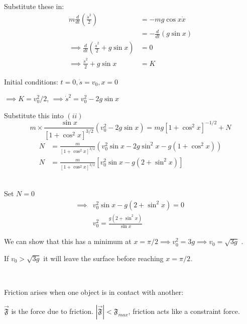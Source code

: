 \documentclass[10pt]{scrartcl}
\renewcommand{\F}{\mathfrak{F}}
\begin{document}
\begin{example}
Substitute these in: 
\[
\begin{aligned}
  m\frac{d}{dt}\left(\frac{\dot{s}^2}{2}\right) &= -mg\cos x \dot{x}\\
  &= -\frac{d}{dt}(g\sin x)\\
  \implies \frac{d}{dt}\left(\frac{\dot{s}^2}{2} + g\sin x\right) &= 0\\
  \implies \frac{\dot{s}^2}{2} + g\sin x &= K
\end{aligned}
\]

Initial conditions: $t = 0, \dot{s} = v_0, x = 0$

$\implies K = v_0^2/2$, $\implies \dot{s}^2 = v_0^2 - 2g\sin x$

Substitute this into $(ii)$
\[
  m \times \frac{\sin x}{[1 + \cos^2x]^{3/2}}(v_0^2 - 2g\sin x) =
  mg[1+\cos^2x]^{-1/2} + N
\]
\[
\begin{aligned}
  N &= \frac{m}{[1+\cos^2x]^{3/2}}(v_0^2\sin x -2g\sin^2x - g(1 + \cos^2x))\\
  N &= \frac{m}{[1+\cos^2x]^{3/2}}[v_0^2\sin x - g(2 + \sin^2x)]
  \end{aligned}
\]~

Set $N = 0$
\[
\begin{aligned}
  \implies &v_0^2\sin x - g(2 + \sin^2x) = 0\\
  &v_0^2 = \frac{g(2 + \sin^2x)}{\sin x}
\end{aligned}
\]

We can show that this has a minimum at $x = \pi/2 \implies v_0^2 = 3g \implies v_0 = \sqrt{3g}$ .

If $v_0 > \sqrt{3g}$ it will leave the surface before reaching $x = \pi/2$. 
\end{example}~

  Friction arises   when one object is in contact with another: 
  
  \begin{center}
  \end{center}
 

$\vec{\F}$ is the force due to friction. $|\vec{\F}| < \F_{max}$, friction acts like a constraint force. 
\end{document}
